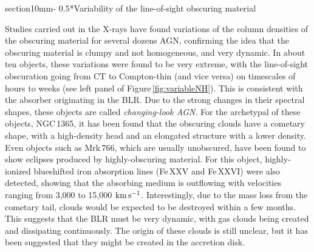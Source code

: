 \documentclass{natureprintstyle}
\makeatletter
\renewcommand{\section}{\@startsection%
{section}{1}{0mm}{-\baselineskip}%
{0.5\baselineskip}{\normalfont\Large\bfseries}}%
\makeatother
\begin{document}
\section*{Variability of the line-of-sight obscuring material}
\label{variability}

\begin{figure*}[t!]
\centering
{}
\caption{{Examples of absorption variability in the X-ray spectrum of nearby AGN.} (a) Absorption variability observed in the X-ray spectrum of NGC\,1365\cite{Risaliti07}. The three {\it Chandra} observations were carried out two days from each other. The spectrum of the second observation clearly shows the flat continuum and prominent Fe\,K$\alpha$ line typical of heavily obscured AGN. (b) {\it NuSTAR} observations of NGC\,1068\cite{Marinucci:2016eu}, showing an excess above 20\,keV in August 2014 that can be explained by a cloud moving away from the line-of-sight, allowing for the first time to observe the nuclear X-ray continuum of this source.}
\label{fig:variableNH}
\end{figure*}



Studies carried out in the X-rays have found variations of the column densities of the obscuring material for several dozens AGN, confirming the idea that the obscuring material is clumpy and not homogeneous, and very dynamic. In about ten objects\cite{Risaliti07,Guainazzi:2002mz,Piconcelli:2007bh}, these variations were found to be very extreme, with the line-of-sight obscuration going from CT to Compton-thin (and vice versa) on timescales of hours to weeks (see left panel of Figure\,\ref{fig:variableNH}). This is consistent with the absorber originating in the BLR. Due to the strong changes in their spectral shapes, these objects are called {\it changing-look AGN}. For the archetypal of these objects, NGC\,1365, it has been found that the obscuring clouds have a cometary shape\cite{Maiolino:2010fu}, with a high-density head and an elongated structure with a lower density. Even objects such as Mrk\,766\cite{Risaliti:2011jl}, which are usually unobscured, have been found to show eclipses produced by highly-obscuring material. For this object, highly-ionized blueshifted iron absorption lines (Fe\,XXV and Fe\,XXVI) were also detected, showing that the absorbing medium is outflowing with velocities ranging from 3,000 to 15,000\,$\rm\,km\,s^{-1}$. Interestingly, due to the mass loss from the cometary tail, clouds would be expected to be destroyed within a few months\cite{Maiolino:2010fu}. This suggests that the BLR must be very dynamic, with gas clouds being created and dissipating continuously. The origin of these clouds is still unclear, but it has been suggested that they might be created in the accretion disk\cite{Elitzur:2009hh}.
\end{document}
